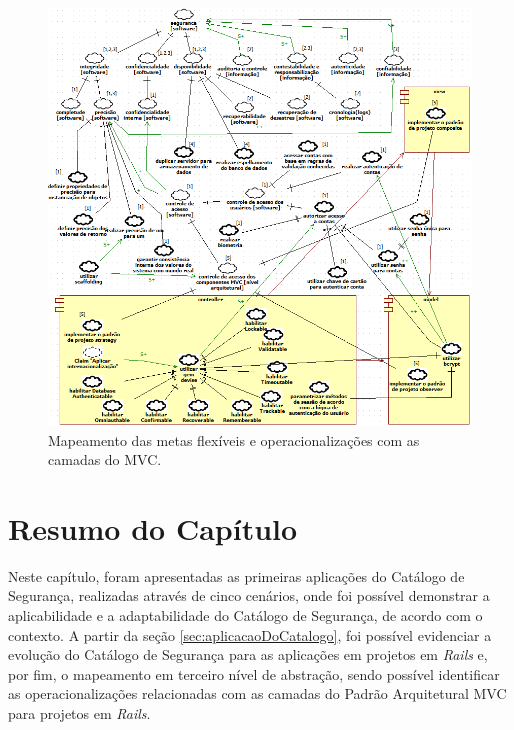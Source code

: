 \begin{figure}[h!]
	\centering
	\includegraphics[keepaspectratio=true,scale=0.7]{figuras/catalogoMapeado.PNG}
	\caption{Mapeamento das metas flexíveis e operacionalizações com as camadas do MVC.}
	\label{catalogoMapeado}
\end{figure}

\pagebreak

\section*{Resumo do Capítulo}

Neste capítulo, foram apresentadas as primeiras aplicações do Catálogo de Segurança, realizadas através de cinco cenários, onde foi possível demonstrar a aplicabilidade e a adaptabilidade do Catálogo de Segurança, de acordo com o contexto. A partir da seção \ref{sec:aplicacaoDoCatalogo}, foi possível evidenciar a evolução do Catálogo de Segurança para as aplicações em projetos em \textit{Rails} e, por fim, o mapeamento em terceiro nível de abstração, sendo possível identificar as operacionalizações relacionadas com as camadas do Padrão Arquitetural MVC para projetos em \textit{Rails}.


